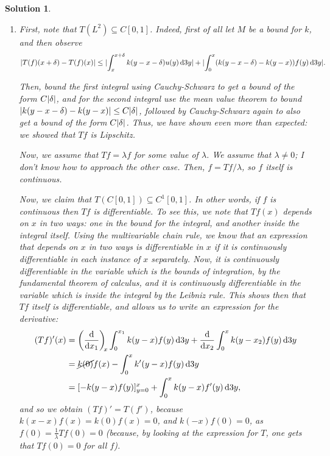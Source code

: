 \documentclass{article}
\theoremstyle{nonumberplain}
\newtheorem{sol}{Solution}
\DeclarePairedDelimiter{\abs}{\lvert}{\rvert}
\begin{document}
\begin{sol}
\leavevmode
\begin{enumerate}
\item First, note that $T(L^2) \subseteq C[0,1]$. Indeed, first of all let $M$ be a bound for $k$, and then observe
\begin{equation}
\abs{T(f)(x+\delta) - T(f)(x)} \leq \abs{\int_x^{x+\delta} k(y-x-\delta) u(y) \dl3y} + \abs{\int_0^x (k(y-x-\delta)-k(y-x)) f(y) \dl3 y}.
\end{equation}

Then, bound the first integral using Cauchy-Schwarz to get a bound of the form $C \abs\delta$, and for the second integral use the mean value theorem to bound $\abs{k(y-x-\delta)-k(y-x)} \leq C \abs\delta$, followed by Cauchy-Schwarz again to also get a bound of the form $C \abs\delta$. Thus, we have shown even more than expected: we showed that $Tf$ is Lipschitz.

Now, we assume that $Tf = \lambda f$ for some value of $\lambda$. We assume that $\lambda \neq 0$; I don't know how to approach the other case. Then, $f = Tf/\lambda$, so $f$ itself is continuous.

Now, we claim that $T(C[0,1]) \subseteq C^1[0,1]$. In other words, if $f$ is continuous then $Tf$ is differentiable. To see this, we note that $Tf(x)$ depends on $x$ in two ways: one in the bound for the integral, and another inside the integral itself. Using the multivariable chain rule, we know that an expression that depends on $x$ in two ways is differentiable in $x$ if it is continuously differentiable in each instance of $x$ separately. Now, it is continuously differentiable in the variable which is the bounds of integration, by the fundamental theorem of calculus, and it is continuously differentiable in the variable which is inside the integral by the Leibniz rule. This shows then that $Tf$ itself is differentiable, and allows us to write an expression for the derivative:
\begin{equation}
\begin{aligned}
(Tf)'(x)
&= \diff{}{x_1}[x] \int_0^{x_1} k(y-x) f(y) \dl3 y + \diff{}{x_2} \int_0^x k(y-x_2) f(y) \dl3 y\\
&= \cancel{k(0)} f(x) - \int_0^x k'(y-x) f(y) \dl3 y\\
&= [-k(y-x)f(y)]_{y=0}^x + \int_0^x k(y-x) f'(y) \dl3 y,
\end{aligned}
\end{equation}
and so we obtain $(Tf)' = T(f')$, because $k(x-x)f(x) = k(0) f(x) = 0$, and $k(-x)f(0) = 0$, as $f(0) = \frac1\lambda Tf(0) = 0$ (because, by looking at the expression for $T$, one gets that $Tf(0) = 0$ for all $f$).


\end{enumerate}
\end{sol}
\end{document}
